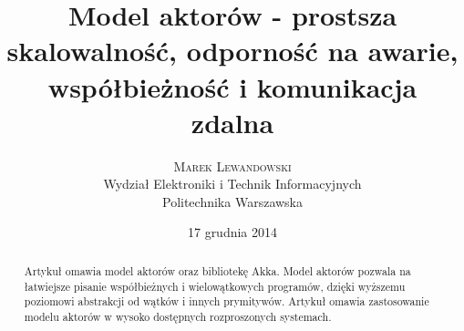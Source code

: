 \documentclass[oneside, 12pt, a4paper]{article}
\title{\vspace{-15mm}\fontsize{24pt}{10pt}\selectfont\textbf{Model aktorów - prostsza skalowalność, odporność na awarie, współbieżność i komunikacja zdalna}} %
\author{
\large
\textsc{Marek Lewandowski}\\[2mm] %
\normalsize Wydział Elektroniki i Technik Informacyjnych \\ %
\normalsize Politechnika Warszawska \\  %
\date{\normalsize 17 grudnia 2014}
\vspace{-5mm}
}
\begin{document}
\maketitle %

\thispagestyle{fancy} %


\begin{abstract}

\noindent 

Artykuł omawia model aktorów oraz bibliotekę Akka. Model aktorów pozwala na łatwiejsze pisanie współbieżnych i wielowątkowych 
programów, dzięki wyższemu poziomowi abstrakcji od wątków i innych prymitywów. Artykuł omawia zastosowanie modelu aktorów w wysoko dostępnych rozproszonych systemach.

\end{abstract}

\end{document}
